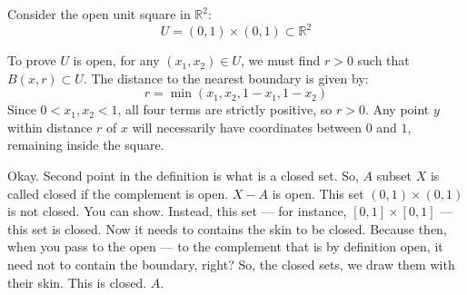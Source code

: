 \begin{math-stroke}
Consider the open unit square in $\mathbb{R}^2$:
\[ U = (0, 1) \times (0, 1) \subset \mathbb{R}^2 \]
\begin{center}
\end{center}
\begin{explanation-of-steps}
To prove $U$ is open, for any $(x_1, x_2) \in U$, we must find $r > 0$ such that $B(x, r) \subset U$. The distance to the nearest boundary is given by:
\[ r = \min(x_1, x_2, 1 - x_1, 1 - x_2) \]
Since $0 < x_1, x_2 < 1$, all four terms are strictly positive, so $r > 0$. Any point $y$ within distance $r$ of $x$ will necessarily have coordinates between $0$ and $1$, remaining inside the square.
\end{explanation-of-steps}
\end{math-stroke}

\begin{spoken-clean}[00:08:37 - 00:10:16]
Okay. Second point in the definition is what is a closed set. So, $A$ subset $X$ is called closed if the complement is open. $X - A$ is open. This set $(0, 1) \times (0, 1)$ is not closed. You can show. Instead, this set --- for instance, $[0, 1] \times [0, 1]$ --- this set is closed. Now it needs to contains the skin to be closed. Because then, when you pass to the open --- to the complement that is by definition open, it need not to contain the boundary, right? So, the closed sets, we draw them with their skin. This is closed. $A$.
\end{spoken-clean}

